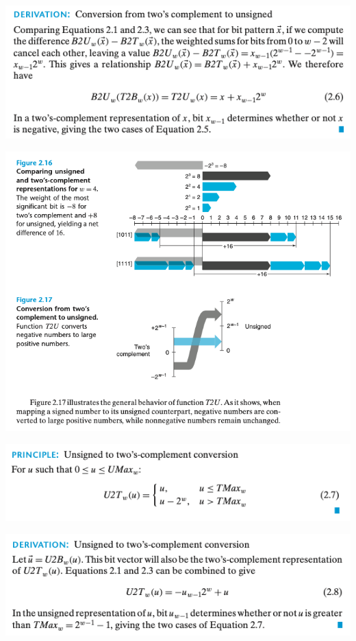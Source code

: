 \documentclass[11pt]{article}
\begin{document}
\begin{center}
\includegraphics[width=.9\linewidth]{pics/derivation-conversion-from-two's-complement-to-unsigned.png}
\end{center}


\begin{center}
\includegraphics[width=.9\linewidth]{pics/t2u-example.png}
\end{center}


\begin{center}
\includegraphics[width=.9\linewidth]{pics/unsigned-to-two's-complement-conversion.png}
\end{center}


\begin{center}
\includegraphics[width=.9\linewidth]{pics/derivation-unsigned-to-two's-complement-conversion.png}
\end{center}
\end{document}
